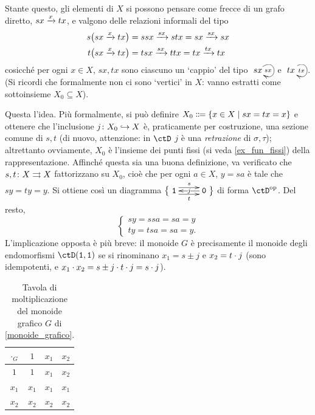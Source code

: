 \begin{example}
 Stante questo, gli elementi di \(X\) si possono pensare come frecce di un grafo diretto, \(sx \xrightarrow{x} tx\), e valgono delle relazioni informali del tipo
 \begin{align*}
  s\big(sx \xrightarrow{x} tx\big) & =ssx \xrightarrow{sx} stx =sx \xrightarrow{sx} sx \\
  t\big(sx \xrightarrow{x} tx\big) & =tsx \xrightarrow{sx} ttx =tx \xrightarrow{tx} tx
 \end{align*}
 cosicché per ogni \(x\in X\), \(sx,tx\) sono ciascuno un `cappio' del tipo \(\xymatrix{sx\ar@(ur,dr)_{sx}}\) e \(\xymatrix{tx\ar@(ur,dr)_{tx}}\). (Si ricordi che formalmente non ci sono `vertici' in \(X\): vanno estratti come sottoinsieme \(X_0\subseteq X\)).

 Questa l'idea. Più formalmente, si può definire \(X_0\defeq \{x\in X\mid sx=tx=x\}\) e ottenere che l'inclusione \(j \colon X_0\hookrightarrow X\) è, praticamente per costruzione, una sezione comune di \(s,t\) (di nuovo, attenzione: in \(\ctD\) \(j\) è una \emph{retrazione} di \(\sigma,\tau\)); altrettanto ovviamente, \(X_0\) è l'insieme dei punti fissi (si veda \ref{ex_fun_fissi}) della rappresentazione. Affinché questa sia una buona definizione, va verificato che \(s,t \colon X \rightrightarrows X\) fattorizzano su \(X_0\), cioè che per ogni \(a\in X\), \(y=sa\) è tale che \(sy=ty=y\). Si ottiene così un diagramma \(\big\{\xymatrix{ \texttt{1} \ar@<.4em>[r]^-s\ar@<-.4em>[r]_-t & \texttt{0}\ar[l]|j }\big\}\) di forma \(\ctD^\op\). Del resto,
 \[\begin{cases}
   sy=ssa=sa=y \\
   ty=tsa=sa=y.
  \end{cases}\]
 L'implicazione opposta è più breve: il monoide \(G\) è precisamente il monoide degli endomorfismi \(\ctD(\texttt{1},\texttt{1})\) se si rinominano \(x_1=s\pm j\) e \(x_2=t\cdot j\) (sono idempotenti, e \(x_1\cdot x_2 = s\pm j\cdot t\cdot j = s\cdot j\)).\color{black}
\end{example}
\begin{table}[h]
 \centering
 \begin{tabular}{c c c c}
  \toprule
  \(\cdot_G\) & \(1\)   & \(x_1\) & \(x_2\) \\
  \midrule
  \(1\)       & \(1\)   & \(x_1\) & \(x_2\) \\
  \(x_1\)     & \(x_1\) & \(x_1\) & \(x_1\) \\
  \(x_2\)     & \(x_2\) & \(x_2\) & \(x_2\) \\
  \bottomrule
 \end{tabular}
 \caption{Tavola di moltiplicazione del monoide grafico \(G\) di \ref{monoide_grafico}.}
 \label{fig_monoide_grfico}
\end{table}

